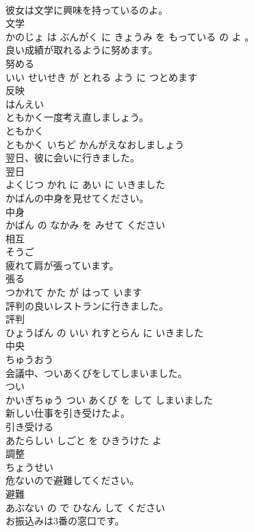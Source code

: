 \documentclass[8pt]{extreport}
\begin{document}
\begin{CJK}{UTF8}{min}
\\	彼女は文学に興味を持っているのよ。	
\\	文学 
\\	かのじょ は ぶんがく に きょうみ を もっている の よ 。			
\\	良い成績が取れるように努めます。	
\\	努める 
\\	いい せいせき が とれる よう に つとめます			
\\	反映	
\\	はんえい			
\\	ともかく一度考え直しましょう。	
\\	ともかく 
\\	ともかく いちど かんがえなおしましょう			
\\	翌日、彼に会いに行きました。	
\\	翌日 
\\	よくじつ かれ に あい に いきました			
\\	かばんの中身を見せてください。	
\\	中身 
\\	かばん の なかみ を みせて ください			
\\	相互	
\\	そうご			
\\	疲れて肩が張っています。	
\\	張る 
\\	つかれて かた が はって います			
\\	評判の良いレストランに行きました。	
\\	評判 
\\	ひょうばん の いい れすとらん に いきました			
\\	中央	
\\	ちゅうおう			
\\	会議中、ついあくびをしてしまいました。	
\\	つい 
\\	かいぎちゅう つい あくび を して しまいました			
\\	新しい仕事を引き受けたよ。	
\\	引き受ける 
\\	あたらしい しごと を ひきうけた よ			
\\	調整	
\\	ちょうせい			
\\	危ないので避難してください。	
\\	避難 
\\	あぶない の で ひなん して ください			
\\	お振込みは3番の窓口です。	

\end{CJK}
\end{document}
